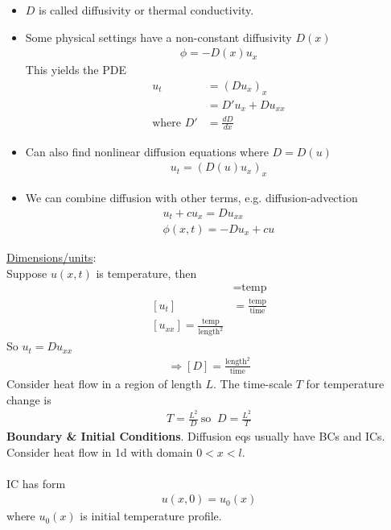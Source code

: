 \documentclass[12pt, letterpaper]{article}
\begin{document}
\begin{itemize}
    \item $D$ is called diffusivity or thermal conductivity.
    \item Some physical settings have a non-constant diffusivity $D(x)$
    \begin{align*}
        \phi = - D(x)u_x
    \end{align*}
    This yields the PDE
    \begin{align*}
        u_t &= (Du_x)_x \\
        &= D'u_x + Du_{xx} \\
        \text{where } D' &= \frac{dD}{dx}
    \end{align*}
    \item Can also find nonlinear diffusion equations where $D = D(u)$
    \begin{align*}
        u_t = (D(u)u_x)_x
    \end{align*}
    \item We can combine diffusion with other terms, e.g. diffusion-advection
    \begin{align*}
        u_t + cu_x = Du_{xx} \\
        \phi(x,t) = - Du_x + cu
    \end{align*}
\end{itemize}
\underline{Dimensions/units}:\\
Suppose $u(x,t)$ is temperature, then 
\begin{align*}
    [u] &= \text{temp} \\
    [u_t] &= \frac{\text{temp}}{\text{time}} \\
    [u_{xx}] = \frac{\text{temp}}{\text{length}^2}
\end{align*}
So $u_t = Du_{xx}$
\begin{align*}
    \Rightarrow[D] = \frac{\text{length}^2}{\text{time}}
\end{align*}
Consider heat flow in a region of length $L$. The time-scale $T$ for temperature change is 
\begin{align*}
    T = \frac{L^2}{D} \ \text{so } \ D = \frac{L^2}{T}
\end{align*}
\textbf{Boundary \& Initial Conditions}.
Diffusion eqs usually have BCs and ICs. Consider heat flow in 1d with domain $0<x<l$. \\ \\
IC has form 
\begin{align*}
    u(x,0) = u_0(x)
\end{align*}
where $u_0(x)$ is initial temperature profile. \\ \\
\end{document}
